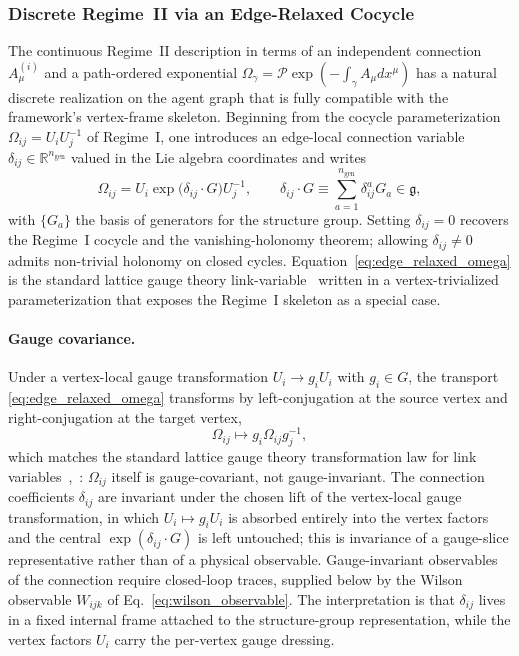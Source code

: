 \documentclass[11pt]{article}
\begin{document}
\subsubsection{Discrete Regime~II via an Edge-Relaxed Cocycle}
\label{sec:discrete_regime_ii}

The continuous Regime~II description in terms of an independent connection $A^{(i)}_\mu$ and a path-ordered exponential $\Omega_\gamma = \mathcal{P}\exp(-\int_\gamma A_\mu dx^\mu)$ has a natural discrete realization on the agent graph that is fully compatible with the framework's vertex-frame skeleton. Beginning from the cocycle parameterization $\Omega_{ij} = U_iU_j^{-1}$ of Regime~I, one introduces an edge-local connection variable $\delta_{ij} \in \mathbb{R}^{n_{\mathrm{gen}}}$ valued in the Lie algebra coordinates and writes
\begin{equation}
\Omega_{ij} = U_i \exp\big(\delta_{ij}\cdot G\big) U_j^{-1},
\qquad
\delta_{ij}\cdot G \equiv \sum_{a=1}^{n_{\mathrm{gen}}} \delta_{ij}^{a} G_a \in \mathfrak{g},
\label{eq:edge_relaxed_omega}
\end{equation}
with $\{G_a\}$ the basis of generators for the structure group. Setting $\delta_{ij}=0$ recovers the Regime~I cocycle and the vanishing-holonomy theorem; allowing $\delta_{ij}\neq 0$ admits non-trivial holonomy on closed cycles. Equation~\eqref{eq:edge_relaxed_omega} is the standard lattice gauge theory link-variable~\cite{WilsonConfinement1974, KogutSusskind1975, Creutz1983} written in a vertex-trivialized parameterization that exposes the Regime~I skeleton as a special case.

\paragraph{Gauge covariance.} Under a vertex-local gauge transformation $U_i \to g_i U_i$ with $g_i \in G$, the transport \eqref{eq:edge_relaxed_omega} transforms by left-conjugation at the source vertex and right-conjugation at the target vertex,
\begin{equation}
\Omega_{ij} \longmapsto g_i \Omega_{ij} g_j^{-1},
\label{eq:omega_gauge_law}
\end{equation}
which matches the standard lattice gauge theory transformation law for link variables~\cite[Eq.~12]{WilsonConfinement1974},~\cite[ch.~5 Eq.~5.1]{Creutz1983}: $\Omega_{ij}$ itself is gauge-covariant, not gauge-invariant. The connection coefficients $\delta_{ij}$ are invariant under the chosen lift of the vertex-local gauge transformation, in which $U_i \mapsto g_i U_i$ is absorbed entirely into the vertex factors and the central $\exp(\delta_{ij}\cdot G)$ is left untouched; this is invariance of a gauge-slice representative rather than of a physical observable. Gauge-invariant observables of the connection require closed-loop traces, supplied below by the Wilson observable $W_{ijk}$ of Eq.~\eqref{eq:wilson_observable}. The interpretation is that $\delta_{ij}$ lives in a fixed internal frame attached to the structure-group representation, while the vertex factors $U_i$ carry the per-vertex gauge dressing.
\end{document}
